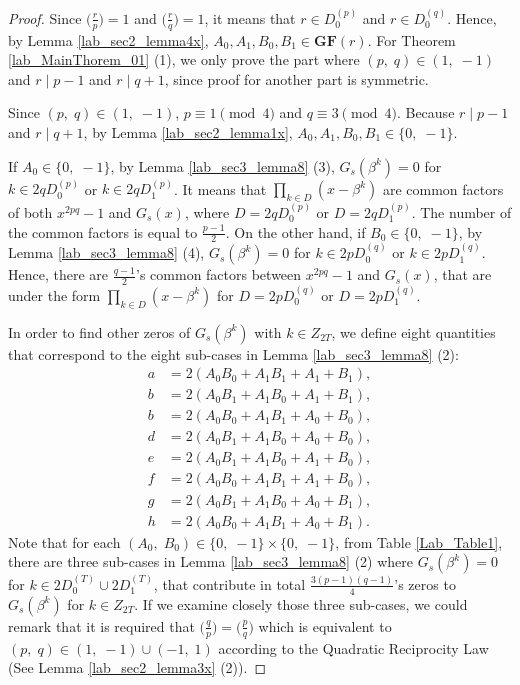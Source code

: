 \documentclass{mcom-l}
\theoremstyle{definition}
\numberwithin{equation}{section}
\begin{document}
     \begin{proof}
       Since $ \bigl(\tfrac{r}{p}\bigr) =1 $ and $ \bigl(\tfrac{r}{q}\bigr) =1 $, it means that $ r\in  D_{0}^{(p)} $ and $ r\in  D_{0}^{(q)} $. Hence, by Lemma \ref{lab_sec2_lemma4x}, $ A_{0},A_{1},B_{0},B_{1} \in \mathbf{GF}(r)$. For Theorem \ref{lab_MainThorem_01} (1), we only prove the part where $ (p,\;q)\in (1,\;-1) $ and $ r\mid p-1 $ and $ r\mid q+1 $, since proof for another part is symmetric.


       Since $ (p,\;q)\in (1,\;-1) $, $ p\equiv 1 \pmod 4 $ and $ q\equiv 3 \pmod 4 $. Because $ r\mid p-1 $ and $ r\mid q+1 $, by Lemma \ref{lab_sec2_lemma1x}, $ A_{0},A_{1},B_{0},B_{1} \in \lbrace 0,\;-1\rbrace$.
       
       
       If $ A_{0} \in \lbrace 0,\;-1\rbrace $, by Lemma \ref{lab_sec3_lemma8} (3), $ G_{s}(\beta^{k})=0 $ for $ k\in 2qD_{0}^{(p)} $ or $ k\in 2qD_{1}^{(p)} $. It means that $ \prod_{k\in D}(x-\beta^{k}) $ are  common factors of both $ x^{2pq}-1 $ and $ G_{s}(x) $, where $ D=2qD_{0}^{(p)} $ or $ D=2qD_{1}^{(p)} $. The number of the common factors is equal to $ \frac{p-1}{2} $. On the other hand, if $ B_{0} \in \lbrace 0,\;-1\rbrace $, by Lemma \ref{lab_sec3_lemma8} (4), $ G_{s}(\beta^{k})=0 $ for $ k\in 2pD_{0}^{(q)} $ or $ k\in 2pD_{1}^{(q)} $. Hence, there are $ \frac{q-1}{2} $'s common factors between  $ x^{2pq}-1 $ and $ G_{s}(x) $, that are under the form $ \prod_{k\in D}(x-\beta^{k}) $ for $ D=2pD_{0}^{(q)} $ or $ D=2pD_{1}^{(q)} $.
       
       In order to find other zeros of $ G_{s}(\beta^{k}) $ with $ k\in Z_{2T} $, we define eight quantities that correspond to the eight sub-cases in Lemma \ref{lab_sec3_lemma8} (2):
       \begin{equation*}
       \begin{split}
       a&=2(A_{0}B_{0}+A_{1}B_{1}+A_{1}+B_{1}),\\
       b&=2(A_{0}B_{1}+A_{1}B_{0}+A_{1}+B_{1}),\\
       b&=2(A_{0}B_{0}+A_{1}B_{1}+A_{0}+B_{0}),\\
       d&=2(A_{0}B_{1}+A_{1}B_{0}+A_{0}+B_{0}),\\
       e&=2(A_{0}B_{1}+A_{1}B_{0}+A_{1}+B_{0}),\\
       f&=2(A_{0}B_{0}+A_{1}B_{1}+A_{1}+B_{0}),\\
       g&=2(A_{0}B_{1}+A_{1}B_{0}+A_{0}+B_{1}),\\
       h&=2(A_{0}B_{0}+A_{1}B_{1}+A_{0}+B_{1}).
       \end{split}
       \end{equation*}
       Note that for each $ (A_{0},\;B_{0}) \in \lbrace 0,\;-1\rbrace \times \lbrace 0,\;-1\rbrace$, from Table \ref{Lab_Table1}, there are three sub-cases in Lemma \ref{lab_sec3_lemma8} (2) where  $ G_{s}(\beta^{k})=0 $ for $ k\in 2D_{0}^{(T)}\cup 2D_{1}^{(T)} $, that contribute in total $ \frac{3(p-1)(q-1)}{4} $'s zeros to $ G_{s}(\beta^{k})$ for $ k\in Z_{2T}$. If we examine closely those three sub-cases, we could remark that it is required that $ \bigl(\tfrac{q}{p}\bigr) =\bigl(\tfrac{p}{q}\bigr) $ which is equivalent to $ (p,\;q)\in (1,\;-1)\cup (-1,\;1) $ according to the Quadratic Reciprocity Law (See Lemma \ref{lab_sec2_lemma3x} (2)).  
       

\end{proof}
\end{document}
